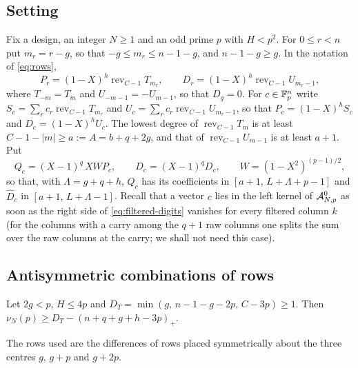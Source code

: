 \subsection{Setting}
Fix a design, an integer $N\ge1$ and an odd prime $p$ with $H<p^2$. For $0\le r<n$ put $m_r=r-g$, so that
$-g\le m_r\le n-1-g$, and $n-1-g\ge g$. In the notation of \eqref{eq:rows},
\[
 P_r=(1-X)^h\operatorname{rev}_{C-1}T_{m_r},\qquad D_r=(1-X)^h\operatorname{rev}_{C-1}U_{m_r-1},
\]
where $T_{-m}=T_m$ and $U_{-m-1}=-U_{m-1}$, so that $D_g=0$. For $c\in\mathbb F_p^n$ write
$S_c=\sum_rc_r\operatorname{rev}_{C-1}T_{m_r}$ and $U_c=\sum_rc_r\operatorname{rev}_{C-1}U_{m_r-1}$, so that $P_c=(1-X)^hS_c$
and $D_c=(1-X)^hU_c$. The lowest degree of $\operatorname{rev}_{C-1}T_m$ is at least $C-1-|m|\ge a:=A=b+q+2g$, and that of
$\operatorname{rev}_{C-1}U_{m-1}$ is at least $a+1$. Put
\[
 Q_c=(X-1)^q\,XWP_c,\qquad \widehat D_c=(X-1)^qD_c,\qquad W=(1-X^2)^{(p-1)/2},
\]
so that, with $\Lambda=g+q+h$, $Q_c$ has its coefficients in $[a+1,\,L+\Lambda+p-1]$ and $\widehat D_c$ in
$[a+1,\,L+\Lambda-1]$. Recall that a vector $c$ lies in the left kernel of $\mathcal A^0_{N,p}$ as soon as the
right side of \eqref{eq:filtered-digits} vanishes for every filtered column $k$ (for the columns with a
carry among the $q+1$ raw columns one splits the sum over the raw columns at the carry; we shall not need
this case).

\subsection{Antisymmetric combinations of rows}
\begin{theorem}\label{thm:T}
Let $2g<p$, $H\le4p$ and $D_T=\min(g,\,n-1-g-2p,\,C-3p)\ge1$. Then
$\nu_N(p)\ge D_T-(n+q+g+h-3p)_+$.
\end{theorem}

The rows used are the differences of rows placed symmetrically about the three centres $g$, $g+p$ and
$g+2p$.

